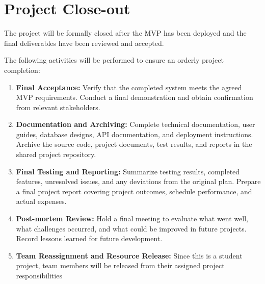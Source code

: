 \documentclass[12pt]{article}
\begin{document}
\section*{Project Close-out}
\par\medskip
The project will be formally closed after the MVP has been deployed and the final deliverables have been reviewed and accepted.
\par\medskip
The following activities will be performed to ensure an orderly project completion:
\par\medskip
\begin{enumerate}
\item \textbf{Final Acceptance:} Verify that the completed system meets the agreed MVP requirements. Conduct a final demonstration and obtain confirmation from relevant stakeholders.
\par
\item \textbf{Documentation and Archiving:} Complete technical documentation, user guides, database designs, API documentation, and deployment instructions. Archive the source code, project documents, test results, and reports in the shared project repository.
\par
\item \textbf{Final Testing and Reporting:} Summarize testing results, completed features, unresolved issues, and any deviations from the original plan. Prepare a final project report covering project outcomes, schedule performance, and actual expenses.
\par
\item \textbf{Post-mortem Review:} Hold a final meeting to evaluate what went well, what challenges occurred, and what could be improved in future projects. Record lessons learned for future development.
\par
\item \textbf{Team Reassignment and Resource Release:} Since this is a student project, team members will be released from their assigned project responsibilities
\par
\end{enumerate}
\hypertarget{sec:434-configuration-management}{}
\end{document}
